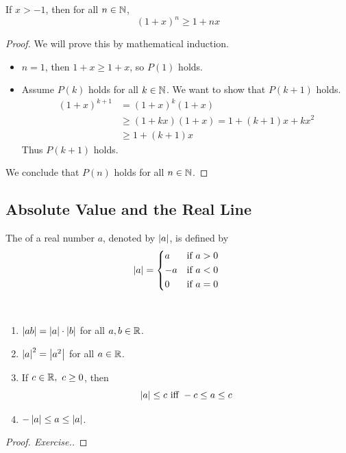 \documentclass[a4paper,12pt]{article}
\begin{document}
\begin{theorem}
    If \(x>-1\), then for all \(n\in\mathbb{N}\),
    \[(1+x)^n\ge 1+nx\]
    \begin{proof}
        We will prove this by mathematical induction.
        \begin{itemize}
            \item \(n=1\), then \(1+x\ge 1+x\), so \(P(1)\) holds.
            \item Assume \(P(k)\) holds for all \(k\in\mathbb{N}\). We want to show that \(P(k+1)\) holds.
            \begin{align*}
                (1+x)^{k+1}&=(1+x)^k(1+x)\\
                &\ge (1+kx)(1+x)=1+(k+1)x+kx^2\\
                &\ge 1+(k+1)x
            \end{align*}
            Thus \(P(k+1)\) holds.
        \end{itemize}
        We conclude that \(P(n)\) holds for all \(n\in\mathbb{N}\).
    \end{proof}
    
\end{theorem}

\newpage
\subsection{Absolute Value and the Real Line}

\begin{definition}
    The  of a real number \(a\), denoted by \(\left\lvert a\right\rvert\), is defined by 
    \[\abs{a}=\begin{cases*}
        a& if \(a>0\)\\
        -a& if \(a<0\)\\
        0& if \(a=0\)
    \end{cases*}\]
\end{definition}

\begin{theorem}\ 
    \begin{enumerate}
        \item \(\left\lvert ab\right\rvert=\left\lvert a\right\rvert\cdot\left\lvert b\right\rvert\) for all \(a,b\in\mathbb{R}\).
        \item \(\left\lvert a\right\rvert^2=\left\lvert a^2\right\rvert\) for all \(a\in\mathbb{R}\).
        \item If \(c\in\mathbb{R},\ c\ge 0\), then 
        \[\left\lvert a\right\rvert\le c\text{ iff }-c\le a\le c\]
        \item \(-\left\lvert a\right\rvert\le a\le \left\lvert a\right\rvert\).
    \end{enumerate}
    \begin{proof}[Proof. Exercise.]
        
    \end{proof}
\end{theorem}
\end{document}
